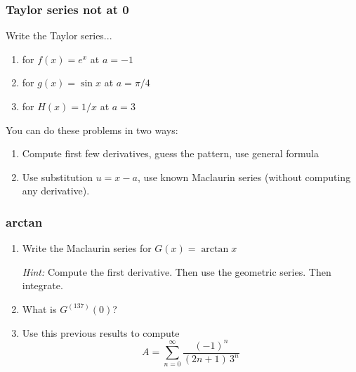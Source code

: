 \begin{frame}[t]
	\frametitle{Taylor series not at 0}

	Write the Taylor series...
	\begin{enumerate}
		\item for \; $\displaystyle f(x) = e^{x}$ \; at \; $a=-1$

		\item for \; $\displaystyle g(x) = \sin x$ \; at \; $\displaystyle a = \pi/4$

		\item for \; $\displaystyle H(x) = 1/x$ \; at \; $\displaystyle a = 3$
	\end{enumerate}

	You can do these problems in two ways:
	\begin{enumerate}
		\item Compute first few derivatives, guess the pattern, use general formula

		\item Use substitution $\displaystyle u = x - a$, use known Maclaurin series
			(without computing any derivative).
	\end{enumerate}
\end{frame}

\begin{frame}[t]
	\frametitle{arctan}

	\begin{enumerate}
		\item Write the Maclaurin series for \; $\displaystyle G(x) = \arctan x$
			\vspace{.2cm}

			\emph{Hint:} Compute the first derivative. Then use the geometric series. Then
			integrate.
			\vspace{.2cm}


		\item What is $\displaystyle G^{(137)}(0)$?
			\vspace{.2cm}


		\item Use this previous results to compute
			\[
				A = \sum_{n=0}^{\infty}\frac{(-1)^{n}}{(2n+1) \, 3^{n}}
			\]
	\end{enumerate}
\end{frame}


